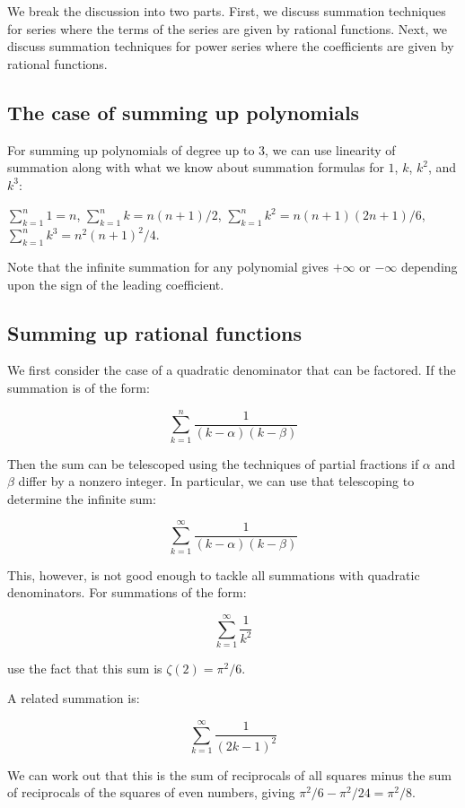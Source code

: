 \documentclass{amsart}
\begin{document}
We break the discussion into two parts. First, we discuss summation
techniques for series where the terms of the series are given by
rational functions. Next, we discuss summation techniques for power
series where the coefficients are given by rational functions.

\subsection{The case of summing up polynomials}

For summing up polynomials of degree up to $3$, we can use linearity
of summation along with what we know about summation formulas for $1$,
$k$, $k^2$, and $k^3$:

$\sum_{k=1}^n 1 = n$, $\sum_{k=1}^n k = n(n+1)/2$, $\sum_{k=1}^n k^2 =
n(n+1)(2n + 1)/6$, $\sum_{k=1}^n k^3 = n^2(n+1)^2/4$.

Note that the infinite summation for any polynomial gives $+\infty$ or
$-\infty$ depending upon the sign of the leading coefficient.

\subsection{Summing up rational functions}

We first consider the case of a quadratic denominator that can be
factored. If the summation is of the form:

$$\sum_{k=1}^n \frac{1}{(k - \alpha)(k - \beta)}$$

Then the sum can be telescoped using the techniques of partial
fractions if $\alpha$ and $\beta$ differ by a nonzero integer. In
particular, we can use that telescoping to determine the infinite sum:

$$\sum_{k=1}^\infty \frac{1}{(k - \alpha)(k - \beta)}$$

This, however, is not good enough to tackle all summations with
quadratic denominators. For summations of the form:

$$\sum_{k=1}^\infty \frac{1}{k^2}$$

use the fact that this sum is $\zeta(2) = \pi^2/6$.

A related summation is:

$$\sum_{k=1}^\infty \frac{1}{(2k - 1)^2}$$

We can work out that this is the sum of reciprocals of all squares
minus the sum of reciprocals of the squares of even numbers, giving
$\pi^2/6 - \pi^2/24 = \pi^2/8$.
\end{document}
